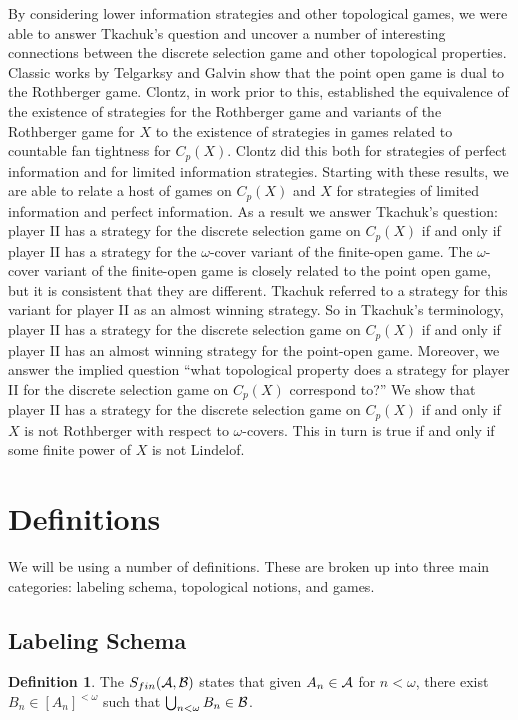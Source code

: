 \documentclass{amsart}
\theoremstyle{plain}
\theoremstyle{definition}
\newtheorem{definition}[theorem]{Definition}
\theoremstyle{remark}
\theoremstyle{plain}
\theoremstyle{definition}
\theoremstyle{remark}
\begin{document}
By considering lower information strategies and other topological games, we were able to answer Tkachuk's question and uncover a number of interesting connections between the discrete selection game and other topological properties.
Classic works by Telgarksy and Galvin show that the point open game is dual to the Rothberger game.
Clontz, in work prior to this, established the equivalence of the existence of strategies for the Rothberger game and variants of the Rothberger game for \(X\)  to the existence of strategies in games related to countable fan tightness for \(C_p(X)\).
Clontz did this both for strategies of perfect information and for limited information strategies.
Starting with these results, we are able to relate a host of games on \(C_p(X)\) and \(X\) for strategies of limited information and perfect information.
As a result we answer Tkachuk's question: player II has a strategy for the discrete selection game on \(C_p(X)\) if and only if player II has a strategy for the \(\omega\)-cover variant of the finite-open game.
The \(\omega\)-cover variant of the finite-open game is closely related to the point open game, but it is consistent that they are different.
Tkachuk referred to a strategy for this variant for player II as an almost winning strategy.
So in Tkachuk's terminology, player II has a strategy for the discrete selection game on \(C_p(X)\) if and only if player II has an almost winning strategy for the point-open game.
Moreover, we answer the implied question ``what topological property does a strategy for player II for the discrete selection game on \(C_p(X)\) correspond to?''
We show that player II has a strategy for the discrete selection game on \(C_p(X)\) if and only if \(X\) is not Rothberger with respect to \(\omega\)-covers.
This in turn is true if and only if some finite power of \(X\) is not Lindelof.

\section{Definitions}

We will be using a number of definitions.
These are broken up into three main categories: labeling schema, topological notions, and games.

\subsection{Labeling Schema}

\begin{definition}
 The  \(S_{fin}(\mathcal{A},\mathcal{B})\) states that given \(A_n\in\mathcal{A}\) for \(n<\omega\), there exist \(B_n\in[A_n]^{<\omega}\) such that \(\bigcup_{n<\omega}B_n\in\mathcal{B}\).
\end{definition}
\end{document}
